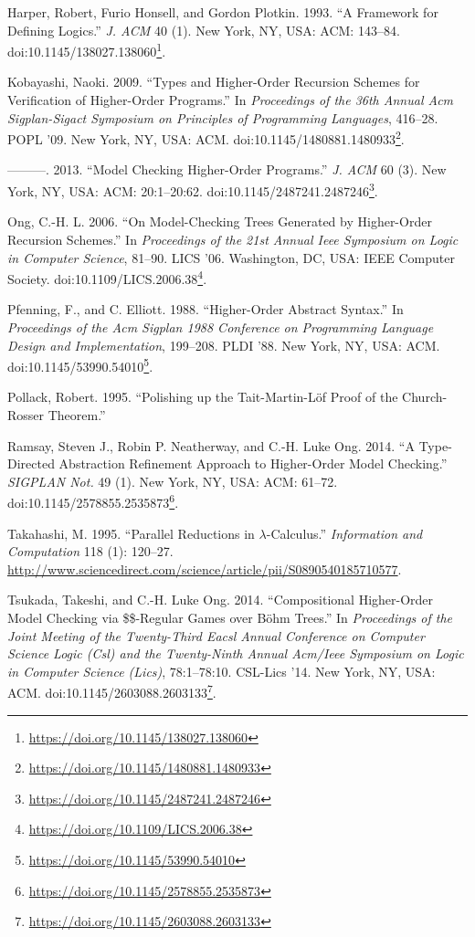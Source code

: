 \documentclass[a4paper, 12pt, twoside]{style/ociamthesis}
\theoremstyle{plain}
\theoremstyle{definition}
\theoremstyle{remark}
\renewcommand{\href}[2]{#2\footnote{\url{#1}}}
\begin{document}
\hypertarget{ref-harper93}{}
Harper, Robert, Furio Honsell, and Gordon Plotkin. 1993. ``A Framework
for Defining Logics.'' \emph{J. ACM} 40 (1). New York, NY, USA: ACM:
143--84.
doi:\href{https://doi.org/10.1145/138027.138060}{10.1145/138027.138060}.

\hypertarget{ref-kobayashi09}{}
Kobayashi, Naoki. 2009. ``Types and Higher-Order Recursion Schemes for
Verification of Higher-Order Programs.'' In \emph{Proceedings of the
36th Annual Acm Sigplan-Sigact Symposium on Principles of Programming
Languages}, 416--28. POPL '09. New York, NY, USA: ACM.
doi:\href{https://doi.org/10.1145/1480881.1480933}{10.1145/1480881.1480933}.

\hypertarget{ref-kobayashi13}{}
---------. 2013. ``Model Checking Higher-Order Programs.'' \emph{J. ACM}
60 (3). New York, NY, USA: ACM: 20:1--20:62.
doi:\href{https://doi.org/10.1145/2487241.2487246}{10.1145/2487241.2487246}.

\hypertarget{ref-ong06}{}
Ong, C.-H. L. 2006. ``On Model-Checking Trees Generated by Higher-Order
Recursion Schemes.'' In \emph{Proceedings of the 21st Annual Ieee
Symposium on Logic in Computer Science}, 81--90. LICS '06. Washington,
DC, USA: IEEE Computer Society.
doi:\href{https://doi.org/10.1109/LICS.2006.38}{10.1109/LICS.2006.38}.

\hypertarget{ref-pfenning88}{}
Pfenning, F., and C. Elliott. 1988. ``Higher-Order Abstract Syntax.'' In
\emph{Proceedings of the Acm Sigplan 1988 Conference on Programming
Language Design and Implementation}, 199--208. PLDI '88. New York, NY,
USA: ACM.
doi:\href{https://doi.org/10.1145/53990.54010}{10.1145/53990.54010}.

\hypertarget{ref-pollack95}{}
Pollack, Robert. 1995. ``Polishing up the Tait-Martin-Löf Proof of the
Church-Rosser Theorem.''

\hypertarget{ref-ramsay14}{}
Ramsay, Steven J., Robin P. Neatherway, and C.-H. Luke Ong. 2014. ``A
Type-Directed Abstraction Refinement Approach to Higher-Order Model
Checking.'' \emph{SIGPLAN Not.} 49 (1). New York, NY, USA: ACM: 61--72.
doi:\href{https://doi.org/10.1145/2578855.2535873}{10.1145/2578855.2535873}.

\hypertarget{ref-takahashi95}{}
Takahashi, M. 1995. ``Parallel Reductions in \(\lambda\)-Calculus.''
\emph{Information and Computation} 118 (1): 120--27.
\url{http://www.sciencedirect.com/science/article/pii/S0890540185710577}.

\hypertarget{ref-tsukada14}{}
Tsukada, Takeshi, and C.-H. Luke Ong. 2014. ``Compositional Higher-Order
Model Checking via \$\$-Regular Games over Böhm Trees.'' In
\emph{Proceedings of the Joint Meeting of the Twenty-Third Eacsl Annual
Conference on Computer Science Logic (Csl) and the Twenty-Ninth Annual
Acm/Ieee Symposium on Logic in Computer Science (Lics)}, 78:1--78:10.
CSL-Lics '14. New York, NY, USA: ACM.
doi:\href{https://doi.org/10.1145/2603088.2603133}{10.1145/2603088.2603133}.
\end{document}
